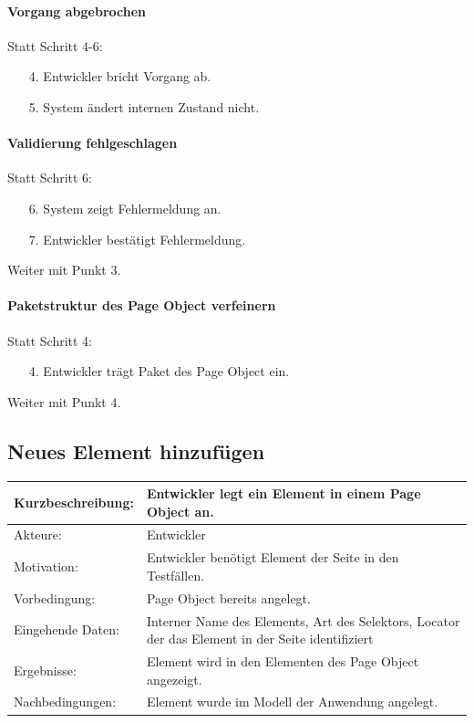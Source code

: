 \paragraph{Vorgang abgebrochen}
Statt Schritt 4-6:
\begin{itemize}[itemsep=0pt]
\item[4.] Entwickler bricht Vorgang ab. 
\item[5.] System ändert internen Zustand nicht. 
\end{itemize}

\paragraph{Validierung fehlgeschlagen}
Statt Schritt 6:
\begin{itemize}[itemsep=0pt]
\item[6.] System zeigt Fehlermeldung an. 
\item[7.] Entwickler bestätigt Fehlermeldung. 
\end{itemize}
Weiter mit Punkt 3. 

\paragraph{Paketstruktur des Page Object verfeinern}
Statt Schritt 4:
\begin{itemize}[itemsep=0pt]
\item[4.] Entwickler trägt Paket des Page Object ein.
\end{itemize}
Weiter mit Punkt 4. 
 

\subsection{Neues Element hinzufügen}
\label{sec:neues_element_hinzufügen}

\begin{tabular}[h]{|p{4cm}|p{}|}
\hline 
\rule[-1ex]{0pt}{2.5ex}Kurzbeschreibung: & 
Entwickler legt ein Element in einem Page Object an. \\  
\hline 
\rule[-1ex]{0pt}{2.5ex}Akteure: & 
Entwickler \\ 
\hline 
\rule[-1ex]{0pt}{2.5ex}Motivation: & 
Entwickler benötigt Element der Seite in den Testfällen. \\ 
\hline 
\rule[-1ex]{0pt}{2.5ex}Vorbedingung: & 
Page Object bereits angelegt.\\ 
\hline 
\rule[-1ex]{0pt}{2.5ex}Eingehende Daten: & Interner Name des Elements, Art des Selektors, Locator der das Element in der Seite identifiziert \\ 
\hline 
\rule[-1ex]{0pt}{2.5ex}Ergebnisse: & Element wird in den Elementen des Page Object angezeigt. \\ 
\hline 
\rule[-1ex]{0pt}{2.5ex}Nachbedingungen: & Element wurde im Modell der Anwendung angelegt.  \\ 
\hline 
\end{tabular} 


